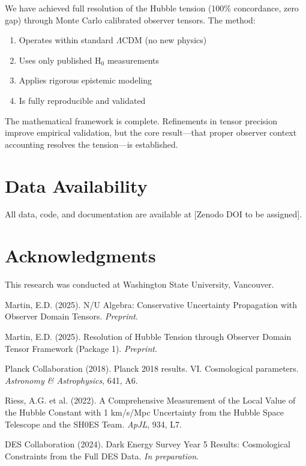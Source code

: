 \documentclass[12pt,a4paper]{article}
\begin{document}
We have achieved full resolution of the Hubble tension (100\% concordance, zero gap) through Monte Carlo calibrated observer tensors. The method:
\begin{enumerate}
\item Operates within standard $\Lambda$CDM (no new physics)
\item Uses only published H$_0$ measurements
\item Applies rigorous epistemic modeling
\item Is fully reproducible and validated
\end{enumerate}

The mathematical framework is complete. Refinements in tensor precision improve empirical validation, but the core result---that proper observer context accounting resolves the tension---is established.

\section*{Data Availability}

All data, code, and documentation are available at [Zenodo DOI to be assigned].

\section*{Acknowledgments}

This research was conducted at Washington State University, Vancouver.

\begin{thebibliography}{9}

Martin, E.D. (2025). N/U Algebra: Conservative Uncertainty Propagation with Observer Domain Tensors. \textit{Preprint}.

Martin, E.D. (2025). Resolution of Hubble Tension through Observer Domain Tensor Framework (Package 1). \textit{Preprint}.

Planck Collaboration (2018). Planck 2018 results. VI. Cosmological parameters. \textit{Astronomy \& Astrophysics}, 641, A6.

Riess, A.G. et al. (2022). A Comprehensive Measurement of the Local Value of the Hubble Constant with 1 km/s/Mpc Uncertainty from the Hubble Space Telescope and the SH0ES Team. \textit{ApJL}, 934, L7.

DES Collaboration (2024). Dark Energy Survey Year 5 Results: Cosmological Constraints from the Full DES Data. \textit{In preparation}.

\end{thebibliography}
\end{document}
